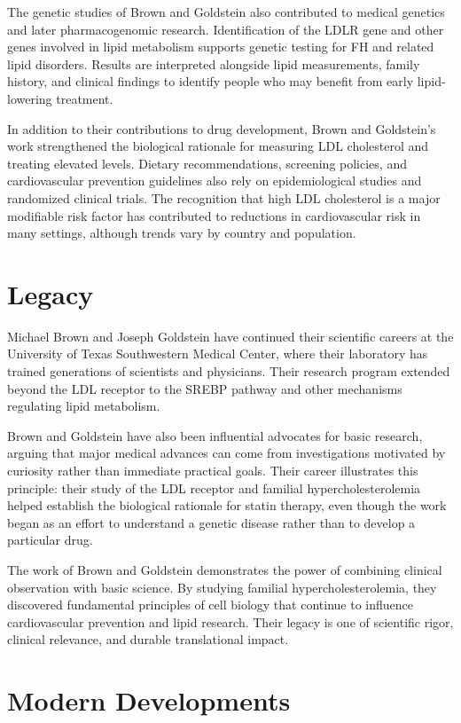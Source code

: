 The genetic studies of Brown and Goldstein also contributed to medical genetics and later pharmacogenomic research. Identification of the LDLR gene and other genes involved in lipid metabolism supports genetic testing for FH and related lipid disorders. Results are interpreted alongside lipid measurements, family history, and clinical findings to identify people who may benefit from early lipid-lowering treatment.

In addition to their contributions to drug development, Brown and Goldstein's work strengthened the biological rationale for measuring LDL cholesterol and treating elevated levels. Dietary recommendations, screening policies, and cardiovascular prevention guidelines also rely on epidemiological studies and randomized clinical trials. The recognition that high LDL cholesterol is a major modifiable risk factor has contributed to reductions in cardiovascular risk in many settings, although trends vary by country and population.

\section{Legacy}

Michael Brown and Joseph Goldstein have continued their scientific careers at the University of Texas Southwestern Medical Center, where their laboratory has trained generations of scientists and physicians. Their research program extended beyond the LDL receptor to the SREBP pathway and other mechanisms regulating lipid metabolism.

Brown and Goldstein have also been influential advocates for basic research, arguing that major medical advances can come from investigations motivated by curiosity rather than immediate practical goals. Their career illustrates this principle: their study of the LDL receptor and familial hypercholesterolemia helped establish the biological rationale for statin therapy, even though the work began as an effort to understand a genetic disease rather than to develop a particular drug.

The work of Brown and Goldstein demonstrates the power of combining clinical observation with basic science. By studying familial hypercholesterolemia, they discovered fundamental principles of cell biology that continue to influence cardiovascular prevention and lipid research. Their legacy is one of scientific rigor, clinical relevance, and durable translational impact.


\section{Modern Developments}

